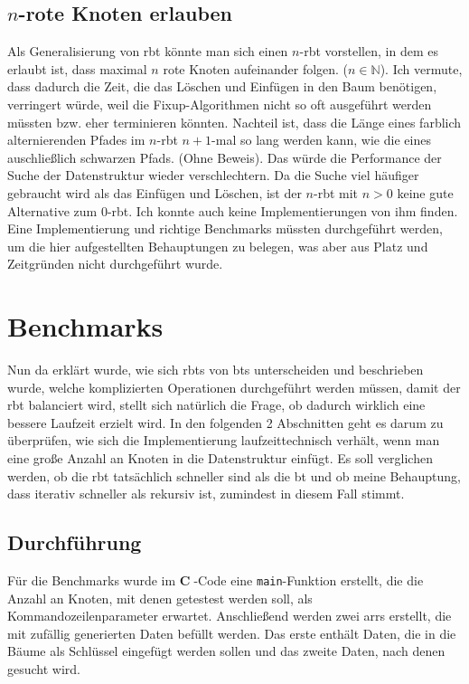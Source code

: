 \documentclass[11pt]{article}
\newcommand{\lstin}[1]{\lstinline[language=C]{#1}}
\newcommand{\cpl}{\textbf{C}$\;$}
\begin{document}
\subsection{$n$-rote Knoten erlauben}
Als Generalisierung von \gls{rbt} könnte man sich einen $n$-\gls{rbt} vorstellen, in dem es erlaubt ist, dass maximal $n$ rote Knoten aufeinander folgen. ($n \in \mathbb{N}$). 
Ich vermute, dass dadurch die Zeit, die das Löschen und Einfügen in den Baum benötigen, verringert würde, weil die Fixup-Algorithmen nicht so oft ausgeführt werden müssten bzw. eher terminieren könnten.\cite[S. 301]{btrees}
Nachteil ist, dass die Länge eines farblich alternierenden Pfades im $n$-\gls{rbt} $n+1$-mal so lang werden kann, wie die eines auschließlich schwarzen Pfads. (Ohne Beweis).
Das würde die Performance der Suche der Datenstruktur wieder verschlechtern. Da die Suche viel häufiger gebraucht wird als das Einfügen und Löschen, ist der $n$-\gls{rbt} mit $n > 0$
keine gute Alternative zum $0$-\gls{rbt}. Ich konnte auch keine Implementierungen von ihm finden.
Eine Implementierung und richtige Benchmarks müssten durchgeführt werden, um die hier aufgestellten Behauptungen zu belegen, was aber aus Platz und Zeitgründen nicht durchgeführt wurde. 

\pagebreak
\section{Benchmarks}

Nun da erklärt wurde, wie sich \glspl{rbt} von \glspl{bt} unterscheiden und beschrieben wurde, welche komplizierten Operationen durchgeführt werden müssen, damit der \gls{rbt} balanciert wird,
stellt sich natürlich die Frage, ob dadurch wirklich eine bessere Laufzeit erzielt wird.
In den folgenden 2 Abschnitten geht es darum zu überprüfen, wie sich die Implementierung laufzeittechnisch verhält, wenn man eine große Anzahl an Knoten in die Datenstruktur einfügt.
Es soll verglichen werden, ob die \gls{rbt} tatsächlich schneller sind als die \gls{bt} und ob meine Behauptung, dass iterativ schneller als rekursiv ist, zumindest in diesem Fall stimmt. 

\subsection{Durchführung}
Für die Benchmarks wurde im \cpl-Code eine \lstin{main}-Funktion erstellt, die die Anzahl an Knoten, mit denen getestest werden soll, als Kommandozeilenparameter erwartet.
Anschließend werden zwei \glspl{arr} erstellt, die mit zufällig generierten Daten befüllt werden. Das erste enthält Daten, die in die Bäume als Schlüssel eingefügt werden sollen und das zweite Daten, nach denen gesucht wird.
\end{document}
